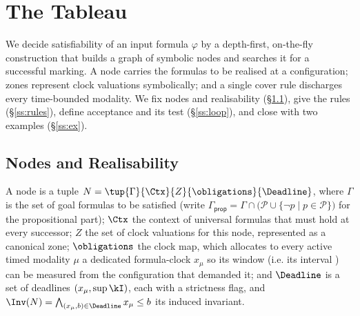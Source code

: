 
\section{The Tableau}\label{sec:tableau}


We decide satisfiability of an input formula $\varphi$ by a depth-first, on-the-fly construction that builds
a graph of symbolic nodes and searches it for a {successful marking}. A node carries the
formulas to be realised at a configuration; zones represent clock valuations symbolically; and a single
{cover} rule discharges every time-bounded modality. We fix nodes and realisability (\S\ref{ss:nodes}), give the rules (\S\ref{ss:rules}), define
acceptance and its test (\S\ref{ss:loop}), and close with two examples (\S\ref{ss:ex}).

\subsection{Nodes and Realisability}\label{ss:nodes}


A {node} is a tuple $N=\tup{\Gamma}{\Ctx}{Z}{\obligations}{\Deadline}$, where $\Gamma$ is the set of
goal formulas to be satisfied (write $\Gamma_{\mathsf{prop}}=\Gamma\cap\big(\mathcal P\cup\{\neg p\mid p\in\mathcal P\}\big)$ for the propositional part); $\Ctx$ the {context} of universal formulas that must
hold at every successor; $Z$ the set of clock valuations for this node, represented as a canonical zone; $\obligations$ the {clock map}, which allocates to every active timed modality $\mu$ a dedicated formula-clock $x_\mu$ so its window (i.e. its interval \kI) can be measured from the configuration that demanded it; and $\Deadline$ is a set of deadlines
$(x_\mu,\sup\kI)$, each with a strictness flag, and $\Inv(N)=\bigwedge_{(x_\mu,b)\in \Deadline}x_\mu\le b$
its induced invariant.

%





